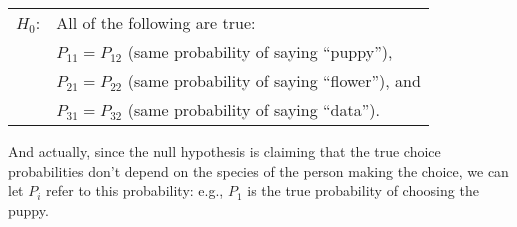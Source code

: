 \smallskip
\begin{tabular}{ll}
$H_0$: \hspace*{0.5cm} & All of the following are true: \\ 
    & $P_{11} = P_{12}$ (same probability of saying ``puppy''), \\ 
	& $P_{21} = P_{22}$ (same probability of saying ``flower''), and\\ 
	& $P_{31} = P_{32}$ (same probability of saying ``data'').\\ 
\end{tabular} 
\smallskip

\noindent
And actually, since the null hypothesis is claiming that the true choice probabilities don't depend on the species of the person making the choice, we can let $P_i$ refer to this probability: e.g., $P_1$ is the true probability of choosing the puppy.

